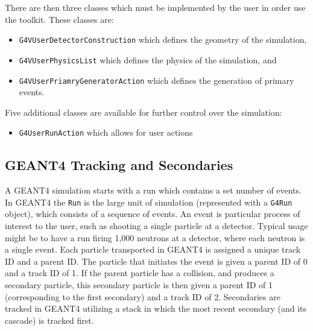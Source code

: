 There are then three classes which must be implemented by the user in order use the toolkit. These classes are:
\begin{itemize}
    \item \verb+G4VUserDetectorConstruction+ which defines the geometry of the simulation,
    \item \verb+G4VUserPhysicsList+ which defines the physics of the simulation, and
    \item \verb+G4VUserPriamryGeneratorAction+ which defines the generation of primary events.
\end{itemize}
Five additional classes are available for further control over the simulation:
\begin{itemize}
    \item \verb+G4UserRunAction+ which allows for user actions
\end{itemize}
\subsection{GEANT4 Tracking and Secondaries}

A GEANT4 simulation starts with a run which contains a set number of events.
In GEANT4 the \verb+Run+ is the large unit of simulation (represented with a \verb+G4Run+ object), which consists of a sequence of events.
An event is particular process of interest to the user, such as shooting a single particle at a detector. 
Typical usage might be to have a run firing 1,000 neutrons at a detector, where each neutron is a single event.
Each particle transported in GEANT4 is assigned a unique track ID and a parent ID.
The particle that initiates the event is given a parent ID of 0 and a track ID of 1.
If the parent particle has a collision, and produces a secondary particle, this secondary particle is then given a parent ID of 1 (corresponding to the first secondary) and a track ID of 2.
Secondaries are tracked in GEANT4 utilizing a stack in which the most recent secondary (and its cascade) is tracked first.

